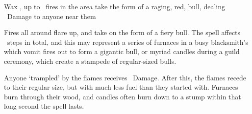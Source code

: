   {\mFire}%
  {Wax}%
  {\detailed, \duplicated}%
  {}%
  {up to \spellArea\ fires in the area take the form of a raging, red, bull, dealing \rollConv\ Damage to anyone near them}%
  {
    Fires all around flare up, and take on the form of a fiery bull.
    The spell affects \spellArea\ steps in total, and this may represent a series of furnaces in a busy blacksmith's which vomit fires out to form a gigantic bull, or myriad candles during a guild ceremony, which create a stampede of regular-sized bulls.

  Anyone `trampled' by the flames receives \rollConv\ Damage.
  After this, the flames recede to their regular size, but with much less fuel than they started with.
  Furnaces burn through their wood, and candles often burn down to a stump within that long second the spell lasts.
  }


